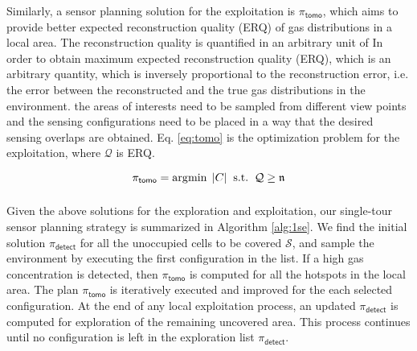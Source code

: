 Similarly, a sensor planning solution for the exploitation is $\pi_{\mathsf{tomo}}$, which aims to provide better expected reconstruction quality (ERQ) of gas distributions in a local area. The reconstruction quality is quantified in an arbitrary unit of 
In order to obtain maximum expected reconstruction quality (ERQ), which is an arbitrary quantity, which is inversely proportional to the reconstruction error, i.e. the error between the reconstructed and the true gas distributions in the environment. the areas of interests need to be sampled from different view points and the sensing configurations need to be placed in a way that the desired sensing overlaps are obtained. Eq. \ref{eq:tomo} is the optimization problem for the exploitation, where $\mathcal{Q}$ is ERQ.


\begin{equation}
\pi_\mathsf{tomo} = \displaystyle\operatorname*{\arg\!\min}_{} \; |C| \;\; \mbox{s.t.} \;\; \mathcal{Q} \ge \mathfrak{n}
\label{eq:tomo}
\end{equation}






Given the above solutions for the exploration and exploitation, our single-tour sensor planning strategy is summarized in Algorithm \ref{alg:1se}. We find the initial solution $\pi_{\mathsf{detect}}$ for all the unoccupied cells to be covered $\mathcal{S}$, and sample the environment by executing the first configuration in the list. If a high gas concentration is detected, then $\pi_{\mathsf{tomo}}$ is computed for all the hotspots in the local area. The plan $\pi_{\mathsf{tomo}}$ is iteratively executed and improved for the each selected configuration. At the end of any local exploitation process, an updated $\pi_{\mathsf{detect}}$ is computed for exploration of the remaining uncovered area. This process continues until no configuration is left in the exploration list $\pi_{\mathsf{detect}}$.

 
